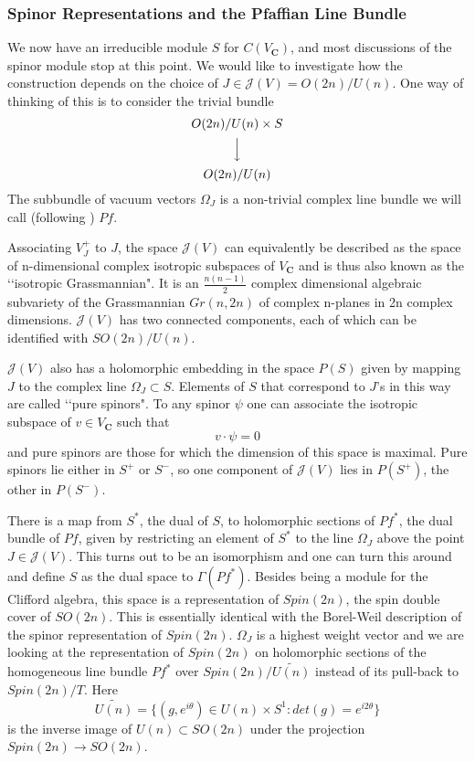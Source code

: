 \documentclass[a4paper,a4paper]{article}
\theoremstyle{conjecture}
\begin{document}
\subsubsection{Spinor Representations and the Pfaffian Line Bundle}
\label{spinor-geometry}
We now have an irreducible module $S$ for $C(V_\mathbf C)$, and
most discussions of the spinor module stop at this point. We would
like to investigate how the construction depends on the choice of
$J\in {\mathcal J}(V)=O(2n)/U(n)$.  One way of thinking of this is
to consider the trivial bundle
\begin{equation*}
\begin{CD}
{} @. O(2n)/U(n)\times S\\
@. @VVV\\
{} @. O(2n)/U(n)
\end{CD}
\end{equation*}
The subbundle of vacuum vectors $\Omega_J$ is a non-trivial
complex line bundle we will call (following \cite{PS}) $Pf$.

Associating $V^+_J$ to $J$, the space ${\mathcal J}(V)$ can
equivalently be described as the space of n-dimensional complex
isotropic subspaces of $V_{\mathbf C}$ and is thus also known as
the \lq\lq isotropic Grassmannian". It is an $\frac{n(n-1)}{2}$
complex dimensional algebraic subvariety of the Grassmannian
$Gr(n,2n)$ of complex n-planes in 2n complex dimensions.
${\mathcal J}(V)$ has two connected components, each of which can
be identified with $SO(2n)/U(n)$.

${\mathcal J}(V)$ also has a holomorphic embedding in the space
$P(S)$ given by mapping $J$ to the complex line $\Omega_J\subset
S$. Elements of $S$ that correspond to $J$'s in this way are
called \lq\lq pure spinors".  To any spinor $\psi$ one can
associate the isotropic subspace of $v\in V_{\mathbf C}$ such that
$$v\cdot\psi=0$$
and pure spinors are those for which the dimension of this space
is maximal. Pure spinors lie either in $S^+$ or $S^-$, so one
component of ${\mathcal J}(V)$ lies in $P(S^+)$, the other in
$P(S^-)$.

There is a map from $S^*$, the dual of $S$, to holomorphic
sections of $Pf^*$, the dual bundle of $Pf$, given by restricting
an element of $S^*$ to the line $\Omega_J$ above the point
$J\in{\mathcal J}(V)$.  This turns out to be an isomorphism
\cite{PS} and one can turn this around and define $S$ as the dual
space to $\Gamma(Pf^*)$.  Besides being a module for the Clifford
algebra, this space is a representation of $Spin(2n)$, the spin
double cover of $SO(2n)$.  This is essentially identical with the
Borel-Weil description of the spinor representation of $Spin(2n)$.
$\Omega_J$ is a highest weight vector and we are looking at the
representation of $Spin(2n)$ on holomorphic sections of the homogeneous
line bundle $Pf^*$ over $Spin(2n)/\widetilde{U(n)}$  instead of
its pull-back to $Spin(2n)/T$. Here
$$\widetilde{U(n)}=\{(g,e^{i\theta})\in U(n)\times S^1:
det(g)=e^{i2\theta}\}$$ is the inverse image of $U(n)\subset
SO(2n)$ under the projection $Spin(2n)\rightarrow SO(2n)$.
\end{document}
